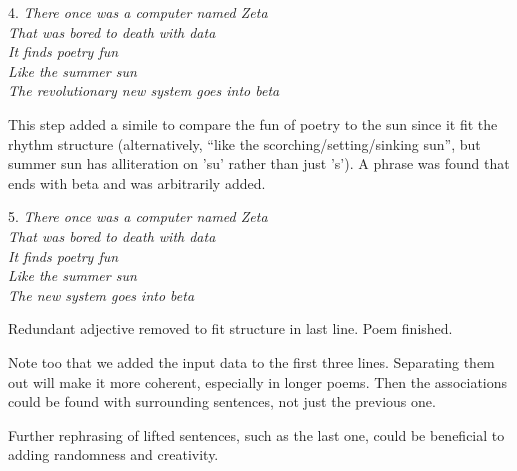 4.
\textit{There once was a computer named Zeta\\
That was bored to death with data\\
It finds poetry fun\\
Like the summer sun\\
The revolutionary new system goes into beta}

This step added a simile to compare the fun of poetry to the sun since it fit the rhythm structure (alternatively, “like the scorching/setting/sinking sun”, but summer sun has alliteration on 'su' rather than just 's'). A phrase was found that ends with beta and was arbitrarily added.

5.
\textit{There once was a computer named Zeta\\
That was bored to death with data\\
It finds poetry fun\\
Like the summer sun\\
The new system goes into beta}

Redundant adjective removed to fit structure in last line. Poem finished.

Note too that we added the input data to the first three lines. Separating them out will make it more coherent, especially in longer poems. Then the associations could be found with surrounding sentences, not just the previous one.

Further rephrasing of lifted sentences, such as the last one, could be beneficial to adding randomness and creativity.

